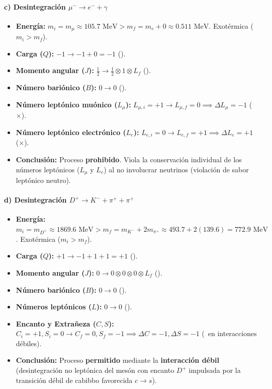 \begin{problema}
\paragraph{c) Desintegración $\mu^- \to e^- + \gamma$}
\begin{itemize}
    \item \textbf{Energía:} $m_i = m_\mu \approx 105.7\text{ MeV} > m_f = m_e + 0 \approx 0.511\text{ MeV}$. Exotérmica ($m_i > m_f$).
    \item \textbf{Carga ($Q$):} $-1 \to -1 + 0 = -1$ (\checkmark).
    \item \textbf{Momento angular ($J$):} $\frac{1}{2} \to \frac{1}{2} \otimes 1 \otimes L_f$ (\checkmark).
    \item \textbf{Número bariónico ($B$):} $0 \to 0$ (\checkmark).
    \item \textbf{Número leptónico muónico ($L_\mu$):} $L_{\mu,i} = +1 \to L_{\mu,f} = 0 \implies \Delta L_\mu = -1$ ($\times$).
    \item \textbf{Número leptónico electrónico ($L_e$):} $L_{e,i} = 0 \to L_{e,f} = +1 \implies \Delta L_e = +1$ ($\times$).
    \item \textbf{Conclusión:} Proceso \textbf{prohibido}. Viola la conservación individual de los números leptónicos ($L_\mu$ y $L_e$) al no involucrar neutrinos (violación de sabor leptónico neutro).
\end{itemize}

\paragraph{d) Desintegración $D^+ \to K^- + \pi^+ + \pi^+$}
\begin{itemize}
    \item \textbf{Energía:} $m_i = m_{D^+} \approx 1869.6\text{ MeV} > m_f = m_{K^-} + 2 m_{\pi^+} \approx 493.7 + 2(139.6) = 772.9\text{ MeV}$. Exotérmica ($m_i > m_f$).
    \item \textbf{Carga ($Q$):} $+1 \to -1 + 1 + 1 = +1$ (\checkmark).
    \item \textbf{Momento angular ($J$):} $0 \to 0 \otimes 0 \otimes 0 \otimes L_f$ (\checkmark).
    \item \textbf{Número bariónico ($B$):} $0 \to 0$ (\checkmark).
    \item \textbf{Números leptónicos ($L$):} $0 \to 0$ (\checkmark).
    \item \textbf{Encanto y Extrañeza ($C, S$):} $C_i = +1, S_i = 0 \to C_f = 0, S_f = -1 \implies \Delta C = -1, \Delta S = -1$ (\checkmark\, en interacciones débiles).
    \item \textbf{Conclusión:} Proceso \textbf{permitido} mediante la \textbf{interacción débil} (desintegración no leptónica del mesón con encanto $D^+$ impulsada por la transición débil de cabibbo favorecida $c \to s$).
\end{itemize}


\end{problema}
